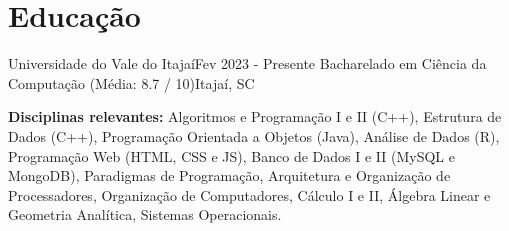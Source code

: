\section{Educação}
    \resumeSubHeadingListStart

    \resumeSubheading
    {Universidade do Vale do Itajaí}{Fev 2023 - Presente}
    {Bacharelado em Ciência da Computação (Média: 8.7 / 10)}{Itajaí, SC}

    \hfill
        
    {\textbf{Disciplinas relevantes:}  Algoritmos e Programação I e II (C++), Estrutura de Dados (C++), Programação Orientada a Objetos (Java), Análise de Dados (R), Programação Web (HTML, CSS e JS), Banco de Dados I e II (MySQL e MongoDB), Paradigmas de Programação, Arquitetura e Organização de Processadores, Organização de Computadores, Cálculo I e II, Álgebra Linear e Geometria Analítica, Sistemas Operacionais.}

    \resumeSubHeadingListEnd